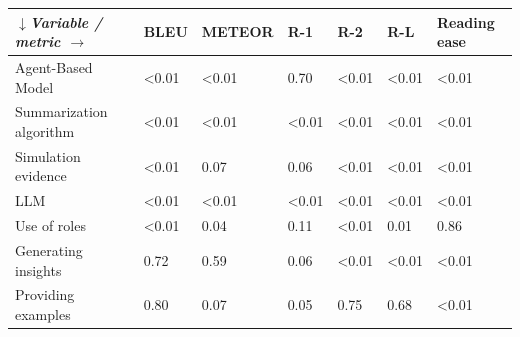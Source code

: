 \begin{tabular}{|l|l|l|l|l|l|l|}
\hline
\textit{$\downarrow$Variable / metric $\rightarrow$} & BLEU & METEOR & R-1 & R-2 & R-L & Reading ease \\
 \hline
 Agent-Based Model & \textless{}0.01 & \textless{}0.01 & 0.70 & \textless{}0.01 & \textless{}0.01 & \textless{}0.01 \\
 \hline
 Summarization algorithm & \textless{}0.01 & \textless{}0.01 & \textless{}0.01 & \textless{}0.01 & \textless{}0.01 & \textless{}0.01 \\
 \hline
 Simulation evidence & \textless{}0.01 & 0.07 & 0.06 & \textless{}0.01 & \textless{}0.01 & \textless{}0.01 \\
 \hline
 LLM & \textless{}0.01 & \textless{}0.01 & \textless{}0.01 & \textless{}0.01 & \textless{}0.01 & \textless{}0.01 \\
 \hline
 Use of roles & \textless{}0.01 & 0.04 & 0.11 & \textless{}0.01 & 0.01 & 0.86 \\
 \hline
 Generating insights & 0.72 & 0.59 & 0.06 & \textless{}0.01 & \textless{}0.01 & \textless{}0.01 \\
 \hline
 Providing examples & 0.80 & 0.07 & 0.05 & 0.75 & 0.68 & \textless{}0.01 \\
\hline
\end{tabular}
